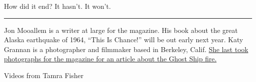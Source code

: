 How did it end? It hasn't. It won't.

\begin{center}\rule{0.5\linewidth}{\linethickness}\end{center}

Jon Mooallem is a writer at large for the magazine. His book about the
great Alaska earthquake of 1964, ``This Is Chance!'' will be out early
next year. Katy Grannan is a photographer and filmmaker based in
Berkeley, Calif.
\href{https://www.nytimes3xbfgragh.onion/2018/12/12/magazine/oakland-warehouse-fire-ghost-ship.html}{She
last took photographs for the magazine for an article about the Ghost
Ship fire.}

Videos from Tamra Fisher

\subsection{}

